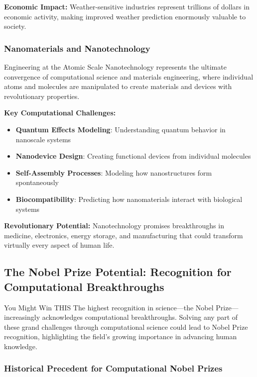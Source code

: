\textbf{Economic Impact:}
Weather-sensitive industries represent trillions of dollars in economic activity, making improved weather prediction enormously valuable to society.

\subsubsection{Nanomaterials and Nanotechnology}

\begin{highlightbox}{Engineering at the Atomic Scale}
Nanotechnology represents the ultimate convergence of computational science and materials engineering, where individual atoms and molecules are manipulated to create materials and devices with revolutionary properties.
\end{highlightbox}

\textbf{Key Computational Challenges:}
\begin{itemize}
    \item \textbf{Quantum Effects Modeling}: Understanding quantum behavior in nanoscale systems
    \item \textbf{Nanodevice Design}: Creating functional devices from individual molecules
    \item \textbf{Self-Assembly Processes}: Modeling how nanostructures form spontaneously
    \item \textbf{Biocompatibility}: Predicting how nanomaterials interact with biological systems
\end{itemize}

\textbf{Revolutionary Potential:}
Nanotechnology promises breakthroughs in medicine, electronics, energy storage, and manufacturing that could transform virtually every aspect of human life.

\subsection{The Nobel Prize Potential: Recognition for Computational Breakthroughs}

\begin{conceptcard}{You Might Win THIS}
The highest recognition in science—the Nobel Prize—increasingly acknowledges computational breakthroughs. Solving any part of these grand challenges through computational science could lead to Nobel Prize recognition, highlighting the field's growing importance in advancing human knowledge.
\end{conceptcard}

\subsubsection{Historical Precedent for Computational Nobel Prizes}

